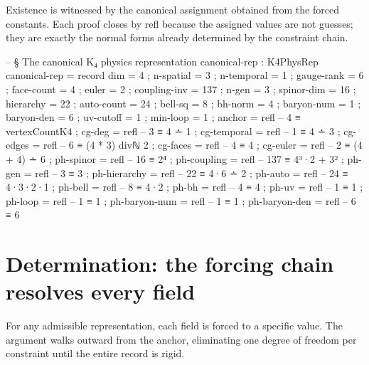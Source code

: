 \documentclass[11pt,a4paper]{book}
\def\texttt#1{#1}%
\begin{document}
Existence is witnessed by the canonical assignment obtained from the forced constants. Each proof closes by \texttt{refl} because the assigned values are not guesses; they are exactly the normal forms already determined by the constraint chain.

\begin{code}
-- § The canonical K₄ physics representation
canonical-rep : K4PhysRep
canonical-rep = record
  { dim          = 4
  ; n-spatial    = 3
  ; n-temporal   = 1
  ; gauge-rank   = 6
  ; face-count   = 4
  ; euler        = 2
  ; coupling-inv = 137
  ; n-gen        = 3
  ; spinor-dim   = 16
  ; hierarchy    = 22
  ; auto-count   = 24
  ; bell-sq      = 8
  ; bh-norm      = 4
  ; baryon-num   = 1
  ; baryon-den   = 6
  ; uv-cutoff    = 1
  ; min-loop     = 1
  ; anchor       = refl   -- 4 ≡ vertexCountK4
  ; cg-deg       = refl   -- 3 ≡ 4 ∸ 1
  ; cg-temporal  = refl   -- 1 ≡ 4 ∸ 3
  ; cg-edges     = refl   -- 6 ≡ (4 * 3) divℕ 2
  ; cg-faces     = refl   -- 4 ≡ 4
  ; cg-euler     = refl   -- 2 ≡ (4 + 4) ∸ 6
  ; ph-spinor    = refl   -- 16 ≡ 2⁴
  ; ph-coupling  = refl   -- 137 ≡ 4³·2 + 3²
  ; ph-gen       = refl   -- 3 ≡ 3
  ; ph-hierarchy = refl   -- 22 ≡ 4·6 ∸ 2
  ; ph-auto      = refl   -- 24 ≡ 4·3·2·1
  ; ph-bell      = refl   -- 8 ≡ 4·2
  ; ph-bh        = refl   -- 4 ≡ 4
  ; ph-uv        = refl   -- 1 ≡ 1
  ; ph-loop      = refl   -- 1 ≡ 1
  ; ph-baryon-num = refl  -- 1 ≡ 1
  ; ph-baryon-den = refl  -- 6 ≡ 6
  }
\end{code}


\section{Determination: the forcing chain resolves every field}

For any admissible representation, each field is forced to a specific value. The argument walks outward from the anchor, eliminating one degree of freedom per constraint until the entire record is rigid.
\end{document}
